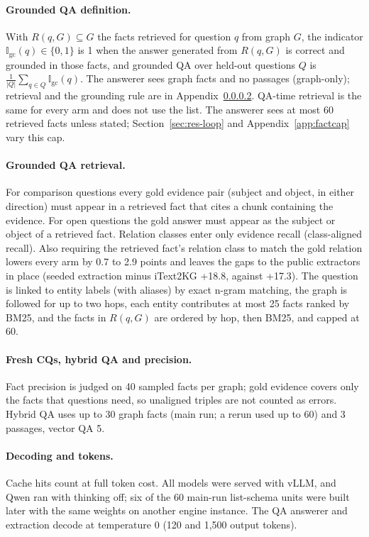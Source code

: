 \paragraph{Grounded QA definition.}\label{app:groundedqa} With $R(q, G) \subseteq G$ the facts retrieved for question $q$ from graph $G$, the indicator $\mathbb{I}_{\text{gc}}(q) \in \{0, 1\}$ is 1 when the answer generated from $R(q, G)$ is correct and grounded in those facts, and grounded QA over held-out questions $Q$ is $\frac{1}{|Q|}\sum_{q \in Q} \mathbb{I}_{\text{gc}}(q)$. The answerer sees graph facts and no passages (graph-only); retrieval and the grounding rule are in Appendix~\ref{app:groundedret}. QA-time retrieval is the same for every arm and does not use the list. The answerer sees at most 60 retrieved facts unless stated; Section~\ref{sec:res-loop} and Appendix~\ref{app:factcap} vary this cap.

\paragraph{Grounded QA retrieval.}\label{app:groundedret} For comparison questions every gold evidence pair (subject and object, in either direction) must appear in a retrieved fact that cites a chunk containing the evidence. For open questions the gold answer must appear as the subject or object of a retrieved fact. Relation classes enter only evidence recall (class-aligned recall). Also requiring the retrieved fact's relation class to match the gold relation lowers every arm by 0.7 to 2.9 points and leaves the gaps to the public extractors in place (seeded extraction minus iText2KG +18.8, against +17.3). The question is linked to entity labels (with aliases) by exact n-gram matching, the graph is followed for up to two hops, each entity contributes at most 25 facts ranked by BM25, and the facts in $R(q, G)$ are ordered by hop, then BM25, and capped at 60.


\paragraph{Fresh CQs, hybrid QA and precision.} Fact precision is judged on 40 sampled facts per graph; gold evidence covers only the facts that questions need, so unaligned triples are not counted as errors. Hybrid QA uses up to 30 graph facts (main run; a rerun used up to 60) and 3 passages, vector QA 5.

\paragraph{Decoding and tokens.} Cache hits count at full token cost. All models were served with vLLM, and Qwen ran with thinking off; six of the 60 main-run list-schema units were built later with the same weights on another engine instance. The QA answerer and extraction decode at temperature 0 (120 and 1,500 output tokens).

